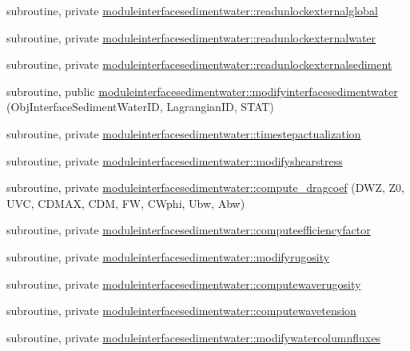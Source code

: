 \begin{DoxyCompactItemize}
\item 
subroutine, private \mbox{\hyperlink{namespacemoduleinterfacesedimentwater_a3b4fc7f1a3bccb01412713961a441cf0}{moduleinterfacesedimentwater\+::readunlockexternalglobal}}
\item 
subroutine, private \mbox{\hyperlink{namespacemoduleinterfacesedimentwater_a23d9e5cbe8c23621607cbca34d93c7f0}{moduleinterfacesedimentwater\+::readunlockexternalwater}}
\item 
subroutine, private \mbox{\hyperlink{namespacemoduleinterfacesedimentwater_a6b368a5d3a18b3829f9bd022591d794a}{moduleinterfacesedimentwater\+::readunlockexternalsediment}}
\item 
subroutine, public \mbox{\hyperlink{namespacemoduleinterfacesedimentwater_ac36014e82a94f1ba694775e21f24b005}{moduleinterfacesedimentwater\+::modifyinterfacesedimentwater}} (Obj\+Interface\+Sediment\+Water\+ID, Lagrangian\+ID, S\+T\+AT)
\item 
subroutine, private \mbox{\hyperlink{namespacemoduleinterfacesedimentwater_acc1eb6dcb216d902e358a53eb7c1604d}{moduleinterfacesedimentwater\+::timestepactualization}}
\item 
subroutine, private \mbox{\hyperlink{namespacemoduleinterfacesedimentwater_a959fd8b47379cd24947cb35417c1563e}{moduleinterfacesedimentwater\+::modifyshearstress}}
\item 
subroutine, private \mbox{\hyperlink{namespacemoduleinterfacesedimentwater_ab7293afe1dc4a5090663cd0d773d6e88}{moduleinterfacesedimentwater\+::compute\+\_\+dragcoef}} (D\+WZ, Z0, U\+VC, C\+D\+M\+AX, C\+DM, FW, C\+Wphi, Ubw, Abw)
\item 
subroutine, private \mbox{\hyperlink{namespacemoduleinterfacesedimentwater_a0e6b11bab2cf3a9864f9e36970079830}{moduleinterfacesedimentwater\+::computeefficiencyfactor}}
\item 
subroutine, private \mbox{\hyperlink{namespacemoduleinterfacesedimentwater_aabfaa7472b679988fdb0647b38a7b879}{moduleinterfacesedimentwater\+::modifyrugosity}}
\item 
subroutine, private \mbox{\hyperlink{namespacemoduleinterfacesedimentwater_a25379264e67d8f64f1b5eb254353c22f}{moduleinterfacesedimentwater\+::computewaverugosity}}
\item 
subroutine, private \mbox{\hyperlink{namespacemoduleinterfacesedimentwater_a8334efc0d8743e6adfd52831e97bb260}{moduleinterfacesedimentwater\+::computewavetension}}
\item 
subroutine, private \mbox{\hyperlink{namespacemoduleinterfacesedimentwater_a052aa500f3fe487c32cb93f8c5a8ea60}{moduleinterfacesedimentwater\+::modifywatercolumnfluxes}}

\end{DoxyCompactItemize}
